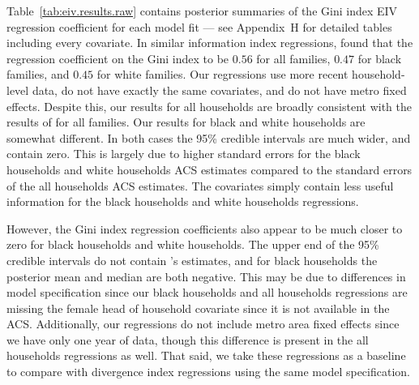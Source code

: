 \documentclass[12pt]{article}
\begin{document}
Table~\ref{tab:eiv.results.raw} contains posterior summaries of the Gini index EIV regression coefficient for each model fit --- see Appendix~H %
  for detailed tables including every covariate. In similar information index regressions, \citet[Table 4]{reardon2011income} found that the regression coefficient on the Gini index to be $0.56$ for all families, $0.47$ for black families, and $0.45$ for white families. Our regressions use more recent household-level data, do not have exactly the same covariates, and do not have metro fixed effects. Despite this, our results for all households are broadly consistent with the results of \citet{reardon2011income} for all families. Our results for black and white households are somewhat different. In both cases the 95\% credible intervals are much wider, and contain zero. This is largely due to higher standard errors for the black households and white households ACS estimates compared to the standard errors of the all households ACS estimates. The covariates simply contain less useful information for the black households and white households regressions.

However, the Gini index regression coefficients also appear to be much closer to zero for black households and white households. The upper end of the 95\% credible intervals do not contain \citet{reardon2011income}'s estimates, and for black households the posterior mean and median are both negative. This may be due to differences in model specification since our black households and all households regressions are missing the female head of household covariate since it is not available in the ACS. Additionally, our regressions do not include metro area fixed effects since we have only one year of data, though this difference is present in the all households regressions as well. That said, we take these regressions as a baseline to compare with divergence index regressions using the same model specification.
\end{document}

